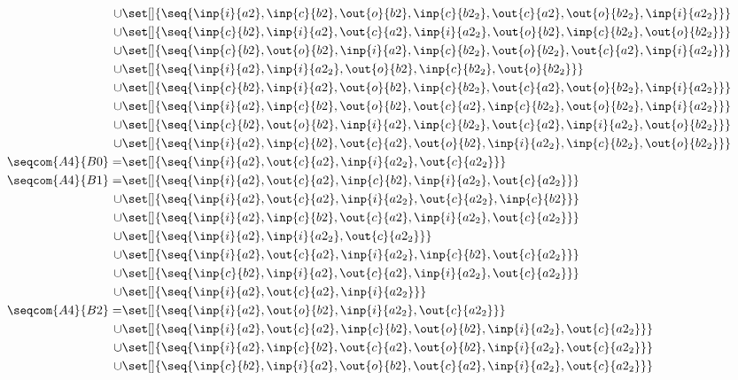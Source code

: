 \begin{align*}
\cup&\set[]{\seq{\inp{i}{a2},\inp{c}{b2},\out{o}{b2},\inp{c}{b2_2},\out{c}{a2},\out{o}{b2_2},\inp{i}{a2_2}}}\\
\cup&\set[]{\seq{\inp{c}{b2},\inp{i}{a2},\out{c}{a2},\inp{i}{a2_2},\out{o}{b2},\inp{c}{b2_2},\out{o}{b2_2}}}\\
\cup&\set[]{\seq{\inp{c}{b2},\out{o}{b2},\inp{i}{a2},\inp{c}{b2_2},\out{o}{b2_2},\out{c}{a2},\inp{i}{a2_2}}}\\
\cup&\set[]{\seq{\inp{i}{a2},\inp{i}{a2_2},\out{o}{b2},\inp{c}{b2_2},\out{o}{b2_2}}}\\
\cup&\set[]{\seq{\inp{c}{b2},\inp{i}{a2},\out{o}{b2},\inp{c}{b2_2},\out{c}{a2},\out{o}{b2_2},\inp{i}{a2_2}}}\\
\cup&\set[]{\seq{\inp{i}{a2},\inp{c}{b2},\out{o}{b2},\out{c}{a2},\inp{c}{b2_2},\out{o}{b2_2},\inp{i}{a2_2}}}\\
\cup&\set[]{\seq{\inp{c}{b2},\out{o}{b2},\inp{i}{a2},\inp{c}{b2_2},\out{c}{a2},\inp{i}{a2_2},\out{o}{b2_2}}}\\
\cup&\set[]{\seq{\inp{i}{a2},\inp{c}{b2},\out{c}{a2},\out{o}{b2},\inp{i}{a2_2},\inp{c}{b2_2},\out{o}{b2_2}}}\\
%
\seqcom{A4}{B0} = &\set[]{\seq{\inp{i}{a2},\out{c}{a2},\inp{i}{a2_2},\out{c}{a2_2}}}\\
%
\seqcom{A4}{B1} = &\set[]{\seq{\inp{i}{a2},\out{c}{a2},\inp{c}{b2},\inp{i}{a2_2},\out{c}{a2_2}}}\\
\cup&\set[]{\seq{\inp{i}{a2},\out{c}{a2},\inp{i}{a2_2},\out{c}{a2_2},\inp{c}{b2}}}\\
\cup&\set[]{\seq{\inp{i}{a2},\inp{c}{b2},\out{c}{a2},\inp{i}{a2_2},\out{c}{a2_2}}}\\
\cup&\set[]{\seq{\inp{i}{a2},\inp{i}{a2_2},\out{c}{a2_2}}}\\
\cup&\set[]{\seq{\inp{i}{a2},\out{c}{a2},\inp{i}{a2_2},\inp{c}{b2},\out{c}{a2_2}}}\\
\cup&\set[]{\seq{\inp{c}{b2},\inp{i}{a2},\out{c}{a2},\inp{i}{a2_2},\out{c}{a2_2}}}\\
\cup&\set[]{\seq{\inp{i}{a2},\out{c}{a2},\inp{i}{a2_2}}}\\
%
\seqcom{A4}{B2} = &\set[]{\seq{\inp{i}{a2},\out{o}{b2},\inp{i}{a2_2},\out{c}{a2_2}}}\\
\cup&\set[]{\seq{\inp{i}{a2},\out{c}{a2},\inp{c}{b2},\out{o}{b2},\inp{i}{a2_2},\out{c}{a2_2}}}\\
\cup&\set[]{\seq{\inp{i}{a2},\inp{c}{b2},\out{c}{a2},\out{o}{b2},\inp{i}{a2_2},\out{c}{a2_2}}}\\
\cup&\set[]{\seq{\inp{c}{b2},\inp{i}{a2},\out{o}{b2},\out{c}{a2},\inp{i}{a2_2},\out{c}{a2_2}}}\\

\end{align*}
